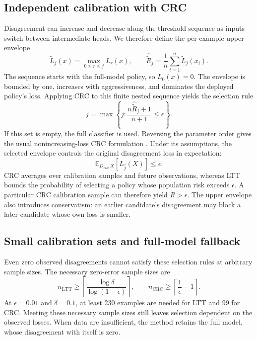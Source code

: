 \documentclass[pdflatex,sn-basic,Numbered]{sn-jnl}
\newcommand{\E}{\mathbb{E}}
\begin{document}
\subsection{Independent calibration with CRC}
Disagreement can increase and decrease along the threshold sequence as inputs switch between intermediate heads. We therefore define the per-example upper envelope
\begin{equation}
 \widetilde L_j(x)=\max_{0\le r\le j}L_r(x),\qquad
 \widehat{\widetilde R}_j=\frac{1}{n}\sum_{i=1}^{n}\widetilde L_j(x_i).
\end{equation}
The sequence starts with the full-model policy, so $L_0(x)=0$. The envelope is bounded by one, increases with aggressiveness, and dominates the deployed policy's loss. Applying CRC to this finite nested sequence yields the selection rule
\begin{equation}
 \widehat j=\max\left\{j:\frac{n\widehat{\widetilde R}_j+1}{n+1}\le\epsilon\right\}.\label{eq:crc}
\end{equation}
If this set is empty, the full classifier is used. Reversing the parameter order gives the usual nonincreasing-loss CRC formulation \cite{crc}. Under its assumptions, the selected envelope controls the original disagreement loss in expectation:
\begin{equation}
 \E_{D_{\mathrm{cal}},X}[L_{\widehat j}(X)]\le\epsilon.
\end{equation}
CRC averages over calibration samples and future observations, whereas LTT bounds the probability of selecting a policy whose population risk exceeds $\epsilon$. A particular CRC calibration sample can therefore yield $R>\epsilon$. The upper envelope also introduces conservatism: an earlier candidate's disagreement may block a later candidate whose own loss is smaller.

\subsection{Small calibration sets and full-model fallback}
Even zero observed disagreements cannot satisfy these selection rules at arbitrary sample sizes. The necessary zero-error sample sizes are
\begin{equation}
 n_{\mathrm{LTT}}\ge\left\lceil\frac{\log\delta}{\log(1-\epsilon)}\right\rceil,
 \qquad n_{\mathrm{CRC}}\ge\left\lceil\frac{1}{\epsilon}-1\right\rceil.
\end{equation}
At $\epsilon=0.01$ and $\delta=0.1$, at least 230 examples are needed for LTT and 99 for CRC. Meeting these necessary sample sizes still leaves selection dependent on the observed losses. When data are insufficient, the method retains the full model, whose disagreement with itself is zero.
\end{document}
